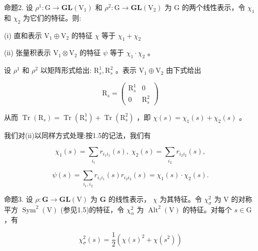 \documentclass[10pt]{article}
\begin{document}
命题2. 设 \({\rho }^{1} : \mathrm{G} \rightarrow  \mathbf{{GL}}\left( {\mathrm{V}}_{1}\right)\) 和 \({\rho }^{2} : \mathrm{G} \rightarrow  \mathbf{{GL}}\left( {\mathrm{V}}_{2}\right)\) 为 \(\mathrm{G}\) 的两个线性表示，令 \({\chi }_{1}\) 和 \({\chi }_{2}\) 为它们的特征。则:

(i) 直和表示 \({\mathrm{V}}_{1} \oplus  {\mathrm{V}}_{2}\) 的特征 \(\chi\) 等于 \({\chi }_{1} + {\chi }_{2}\)

(ii) 张量积表示 \({\mathrm{V}}_{1} \otimes  {\mathrm{V}}_{2}\) 的特征 \(\psi\) 等于 \({\chi }_{1} \cdot  {\chi }_{2}\) 。

设 \({\rho }^{1}\) 和 \({\rho }^{2}\) 以矩阵形式给出: \({\mathrm{R}}_{s}^{1},{\mathrm{R}}_{s}^{2}\) 。表示 \({\mathrm{V}}_{1} \oplus  {\mathrm{V}}_{2}\) 由下式给出

\[
{\mathrm{R}}_{s} = \left( \begin{matrix} {\mathrm{R}}_{s}^{1} & 0 \\  0 & {\mathrm{R}}_{s}^{2} \end{matrix}\right)
\]

从而 \(\operatorname{Tr}\left( {\mathrm{R}}_{s}\right)  = \operatorname{Tr}\left( {\mathrm{R}}_{s}^{1}\right)  + \operatorname{Tr}\left( {\mathrm{R}}_{s}^{2}\right)\) ，即 \(\chi \left( s\right)  = {\chi }_{1}\left( s\right)  + {\chi }_{2}\left( s\right)\) 。

我们对(ii)以同样方式处理:按1.5的记法，我们有

\[
{\chi }_{1}\left( s\right)  = \mathop{\sum }\limits_{{i}_{1}}{r}_{{i}_{1}{i}_{1}}\left( s\right) ,\;{\chi }_{2}\left( s\right)  = \mathop{\sum }\limits_{{i}_{2}}{r}_{{i}_{2}{i}_{2}}\left( s\right) ,
\]

\[
\psi \left( s\right)  = \mathop{\sum }\limits_{{{i}_{1},{i}_{2}}}{r}_{{i}_{1}{i}_{1}}\left( s\right) {r}_{{i}_{2}{i}_{2}}\left( s\right)  = {\chi }_{1}\left( s\right)  \cdot  {\chi }_{2}\left( s\right) .
\]

命题3. 设 \(\rho  : \mathbf{G} \rightarrow  \mathbf{{GL}}\left( \mathrm{V}\right)\) 为 \(\mathbf{G}\) 的线性表示， \(\chi\) 为其特征。令 \({\chi }_{\sigma }^{2}\) 为 \(\mathrm{V}\) 的对称平方 \({\operatorname{Sym}}^{2}\left( \mathrm{V}\right)\) (参见1.5)的特征，令 \({\chi }_{\alpha }^{2}\) 为 \({\operatorname{Alt}}^{2}\left( \mathrm{V}\right)\) 的特征。对每个 \(s \in  \mathrm{G}\) ，有

\[
{\chi }_{\sigma }^{2}\left( s\right)  = \frac{1}{2}\left( {\chi {\left( s\right) }^{2} + \chi \left( {s}^{2}\right) }\right)
\]
\end{document}
